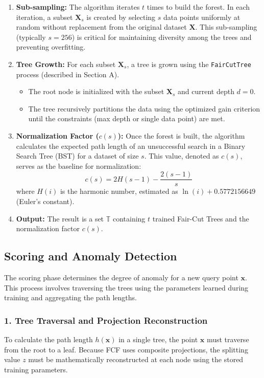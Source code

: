 \begin{enumerate}
    \item \textbf{Sub-sampling:} The algorithm iterates $t$ times to build the forest. In each iteration, a subset $\mathbf{X}_s$ is created by selecting $s$ data points uniformly at random without replacement from the original dataset $\mathbf{X}$. This sub-sampling (typically $s=256$) is critical for maintaining diversity among the trees and preventing overfitting.
    
    \item \textbf{Tree Growth:} For each subset $\mathbf{X}_s$, a tree is grown using the \texttt{FairCutTree} process (described in Section A). 
    \begin{itemize}
        \item The root node is initialized with the subset $\mathbf{X}_s$ and current depth $d=0$.
        \item The tree recursively partitions the data using the optimized gain criterion until the constraints (max depth or single data point) are met.
    \end{itemize}
    
    \item \textbf{Normalization Factor ($c(s)$):} Once the forest is built, the algorithm calculates the expected path length of an unsuccessful search in a Binary Search Tree (BST) for a dataset of size $s$. This value, denoted as $c(s)$, serves as the baseline for normalization:
    $$ c(s) = 2H(s-1) - \frac{2(s-1)}{s} $$
    where $H(i)$ is the harmonic number, estimated as $\ln(i) + 0.5772156649$ (Euler's constant).
    
    \item \textbf{Output:} The result is a set $\mathbb{T}$ containing $t$ trained Fair-Cut Trees and the normalization factor $c(s)$.
\end{enumerate}

\subsection{Scoring and Anomaly Detection}
\label{scoring}
The scoring phase determines the degree of anomaly for a new query point $\mathbf{x}$. This process involves traversing the trees using the parameters learned during training and aggregating the path lengths.

\subsubsection*{1. Tree Traversal and Projection Reconstruction}
To calculate the path length $h(\mathbf{x})$ in a single tree, the point $\mathbf{x}$ must traverse from the root to a leaf. Because FCF uses composite projections, the splitting value $z$ must be mathematically reconstructed at each node using the stored training parameters.

